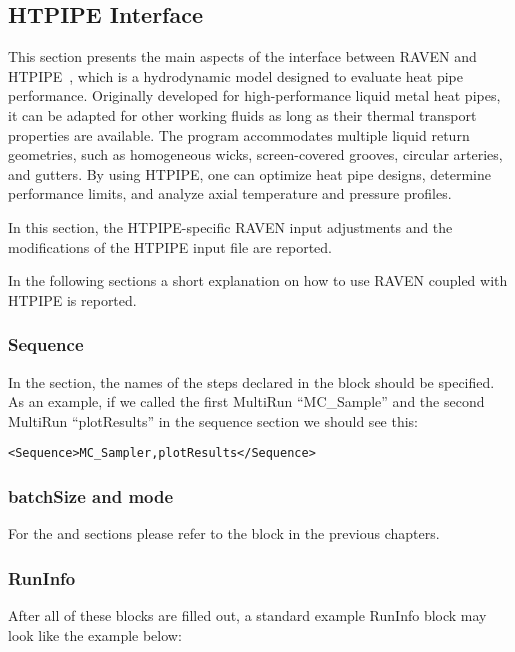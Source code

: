 \subsection{HTPIPE Interface}
This section presents the main aspects of the interface between RAVEN and HTPIPE~\cite{htpipeCodeInterface},
which is a hydrodynamic model designed to evaluate heat pipe performance. Originally developed for high-performance
 liquid metal heat pipes, it can be adapted for other working fluids as long as their thermal transport properties are available.
 The program accommodates multiple liquid return geometries, such as homogeneous wicks, screen-covered grooves, 
 circular arteries, and gutters. By using HTPIPE, one can optimize heat pipe designs, determine performance limits, and 
 analyze axial temperature and pressure profiles.

In this section, the HTPIPE-specific RAVEN input adjustments and the modifications of the HTPIPE
input file are reported. \noindent

\noindent In the following sections a short explanation on how to use RAVEN coupled with HTPIPE is reported.
\subsubsection{Sequence}
In the  section, the names of the steps declared in the
 block should be specified.
%
As an example, if we called the first MultiRun ``MC\_Sample'' and the second
MultiRun ``plotResults'' in the sequence section we should see this:

\begin{lstlisting}[style=XML]
<Sequence>MC_Sampler,plotResults</Sequence>
\end{lstlisting}

\subsubsection{batchSize and mode}
For the  and  sections please refer to the
 block in the previous chapters.

\subsubsection{RunInfo}
After all of these blocks are filled out, a standard example RunInfo block may
look like the example below: \\

